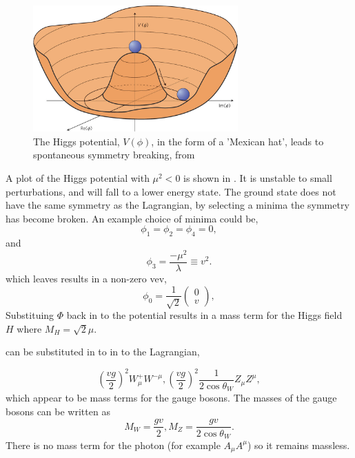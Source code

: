 \begin{figure}[htbp]
  \centering
  \includegraphics[width=0.7\textwidth]{nphys1874-f1.jpg}
  \caption{ The Higgs potential, $V(\phi)$, in the form of a 'Mexican hat',
leads to spontaneous symmetry breaking, from \cite{}}
  \label{fig:higgspot}
\end{figure}

A plot of the Higgs potential with $\mu^{2}<0$ is shown in
. It is unstable to small perturbations, and will fall
to a lower energy state. 
The ground state does not have the same symmetry as the Lagrangian, by
selecting a minima the symmetry has become broken. An example choice of minima
could be,
\begin{equation}
\phi_{1} = \phi_{2} = \phi_{4} = 0,
\end{equation}
and
\begin{equation}
\phi_{3} = \frac{-\mu^{2}}{\lambda} \equiv v^{2}.
\end{equation}
which leaves results in a non-zero \ac{vev},
\begin{equation}
\phi_{0} = \frac{1}{\sqrt{2}}\left(\begin{matrix}0\\v\end{matrix}\right),
\end{equation}
Substituing $\Phi$ back in to the potential results in a mass term for the Higgs
field $H$ where $M_H = \sqrt{2}\mu$.

can be substituted in to
in to the Lagrangian,


\begin{equation}
\left(\frac{vg}{2}\right)^{2} W^{+}_{\mu} W^{- \mu}, 
\left(\frac{vg}{2}\right)^{2} \frac{1}{2\cos\theta_{W}} Z_{\mu} Z^{\mu},
\end{equation}
which appear to be mass terms for the gauge bosons.
The masses of the gauge bosons can be written as 
\begin{equation}
M_{W} = \frac{gv}{2}, 
M_{Z} = \frac{gv}{2\cos\theta_{W}}.
\end{equation}
There is no mass term for the photon (for example $A_{\mu}A^{\mu}$) so it
remains massless.

